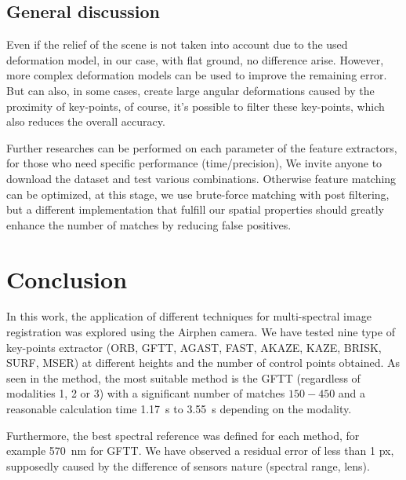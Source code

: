 \documentclass[]{elsarticle}
\begin{document}
	\subsection{General discussion}
	
	\par Even if the relief of the scene is not taken into account due to the used deformation model,
	in our case, with flat ground, no difference arise.
	However, more complex deformation models \cite{Lombaert, ThinPlateSpline} can be used to improve the remaining error.
	But can also, in some cases, create large angular deformations caused by the proximity of key-points,
	of course, it's possible to filter these key-points, which also reduces the overall accuracy.
	\\
	\par Further researches can be performed on each parameter of the feature extractors, for those who need specific performance (time/precision),
	We invite anyone to download the dataset and test various combinations.
	Otherwise feature matching can be optimized, at this stage, we use brute-force matching with post filtering,
	but a different implementation that fulfill our spatial properties should greatly enhance the number of matches by reducing false positives.
	
	
	\section{Conclusion}
	
	\par In this work, the application of different techniques for multi-spectral image registration was explored using the Airphen camera.
	We have tested nine type of key-points extractor (ORB, GFTT, AGAST, FAST, AKAZE, KAZE, BRISK, SURF, MSER)
	at different heights and the number of control points obtained.
	As seen in the method, the most suitable method is the GFTT (regardless of modalities 1, 2 or 3)
	with a significant number of matches $150-450$ and a reasonable calculation time \SI{1.17}{\second} to \SI{3.55}{\second} depending on the modality.
	\\
	\par Furthermore, the best spectral reference was defined for each method, for example \SI{570}{\nano\meter} for GFTT.
	We have observed a residual error of less than 1 px, supposedly caused by the difference of sensors nature (spectral range, lens).
	
\end{document}

